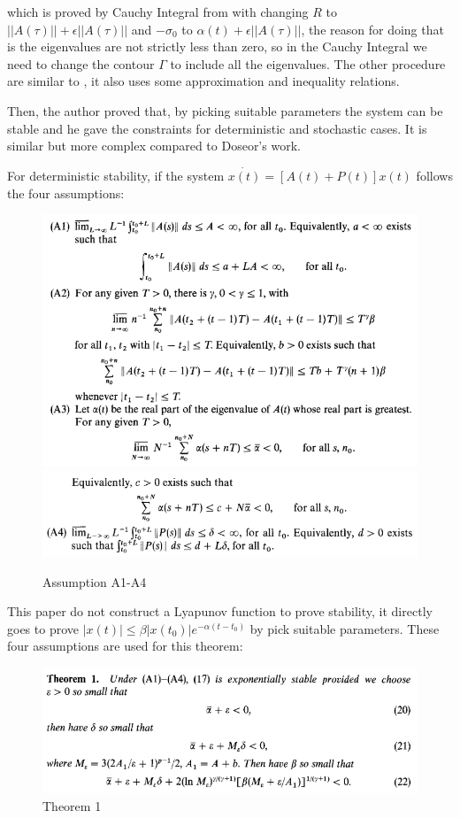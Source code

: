 \documentclass{article}
\begin{document}
which is proved by Cauchy Integral from \cite{desoer1969slowly} with changing $R$ to $||A(\tau)|| + \epsilon||A(\tau)||$ and $-\sigma_0$ to $\alpha(t) + \epsilon||A(\tau)||$, the reason for doing that is the eigenvalues are not strictly less than zero, so in the Cauchy Integral we need to change the contour $\Gamma$ to include all the eigenvalues. The other procedure are similar to \cite{desoer1969slowly}, it also uses some approximation and inequality relations.

Then, the author proved that, by picking suitable parameters the system can be stable and he gave the constraints for deterministic and stochastic cases. It is similar but more complex compared to Doseor's work.

For deterministic stability, if the system $\dot{x(t)} = [A(t) + P(t)] x(t)$ follows the four assumptions:
\begin{figure}[h!]
\centering
\includegraphics[width=0.7\linewidth]{Ref_4_Assumption_1_13.png}
\includegraphics[width=0.68\linewidth]{Ref_4_Assumption_1_4.png}
\caption{Assumption A1-A4}
\end{figure}

This paper do not construct a Lyapunov function to prove stability, it directly goes to prove $|x(t)| \leq \beta |x(t_0)| e^{-\alpha (t-t_0)}$ by pick suitable parameters. These four assumptions are used for this theorem:
\begin{figure}[H]
\centering
\includegraphics[width=0.7\linewidth]{Ref_4_Theorem_1.png}
\caption{Theorem 1}
\label{4_3A13}
\end{figure}
\end{document}
